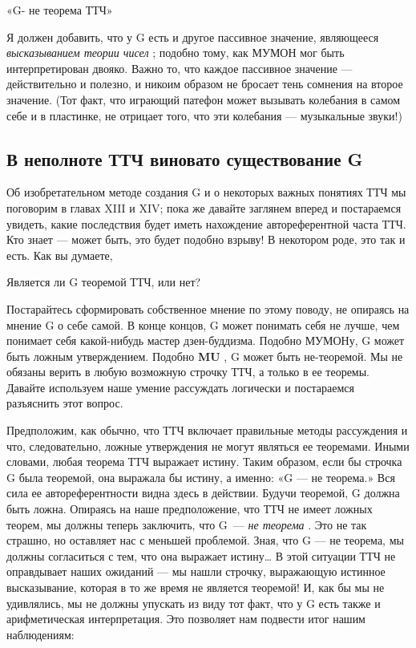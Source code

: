 \documentclass[../main.tex]{subfiles}
\begin{document}
«G- не теорема ТТЧ»

Я должен добавить, что у G есть и другое пассивное значение, являющееся \emph{высказыванием теории чисел} ; подобно тому, как МУМОН мог быть интерпретирован двояко. Важно то, что каждое пассивное значение --- действительно и полезно, и никоим образом не бросает тень сомнения на второе значение. (Тот факт, что играющий патефон может вызывать колебания в самом себе и в пластинке, не отрицает того, что эти колебания --- музыкальные звуки!)


\subsection{В неполноте ТТЧ виновато существование G}

Об изобретательном методе создания G и о некоторых важных понятиях ТТЧ мы поговорим в главах XIII и XIV; пока же давайте заглянем вперед и постараемся увидеть, какие последствия будет иметь нахождение автореферентной часта ТТЧ. Кто знает --- может быть, это будет подобно взрыву! В некотором роде, это так и есть. Как вы думаете,

Является ли G теоремой ТТЧ, или нет?

Постарайтесь сформировать собственное мнение по этому поводу, не опираясь на мнение G о себе самой. В конце концов, G может понимать себя не лучше, чем понимает себя какой-нибудь мастер дзен-буддизма. Подобно МУМОНу, G может быть ложным утверждением. Подобно \textbf{MU} , G может быть не-теоремой. Мы не обязаны верить в любую возможную строчку ТТЧ, а только в ее теоремы. Давайте используем наше умение рассуждать логически и постараемся разъяснить этот вопрос.

Предположим, как обычно, что ТТЧ включает правильные методы рассуждения и что, следовательно, ложные утверждения не могут являться ее теоремами. Иными словами, любая теорема ТТЧ выражает истину. Таким образом, если бы строчка G была теоремой, она выражала бы истину, а именно: «G --- не теорема.» Вся сила ее автореферентности видна здесь в действии. Будучи теоремой, G должна быть ложна. Опираясь на наше предположение, что ТТЧ не имеет ложных теорем, мы должны теперь заключить, что G~--- \emph{не теорема} . Это не так страшно, но оставляет нас с меньшей проблемой. Зная, что G --- не теорема, мы должны согласиться с тем, что она выражает истину\ldots{} В этой ситуации ТТЧ не оправдывает наших ожиданий --- мы нашли строчку, выражающую истинное высказывание, которая в то же время не является теоремой! И, как бы мы не удивлялись, мы не должны упускать из виду тот факт, что у G есть также и арифметическая интерпретация. Это позволяет нам подвести итог нашим наблюдениям:
\end{document}
